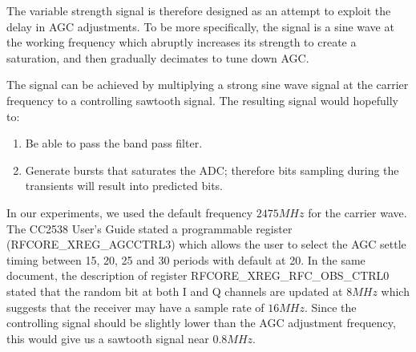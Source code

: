 The variable strength signal is therefore designed as an attempt to exploit the delay in AGC adjustments. To be more specifically, the signal is a sine wave at the working frequency which abruptly increases its strength to create a saturation, and then gradually decimates to tune down AGC. 
 
The signal can be achieved by multiplying a strong sine wave signal at the carrier frequency to a controlling sawtooth signal. The resulting signal would hopefully to:
\begin{enumerate}
	\item Be able to pass the band pass filter.
	\item Generate bursts that saturates the ADC; therefore bits sampling during the transients will result into predicted bits.
\end{enumerate}

In our experiments, we used the default frequency $2475MHz$ for the carrier wave. The CC2538 User's Guide\cite{CC2538Manual} stated a programmable register (RFCORE\_XREG\_AGCCTRL3) which allows the user to select the AGC settle timing between 15, 20, 25 and 30 periods with default at 20. In the same document, the description of register RFCORE\_XREG\_RFC\_OBS\_CTRL0 stated that the random bit at both I and Q channels are updated at $8MHz$ which suggests that the receiver may have a sample rate of $16MHz$. Since the controlling signal should be slightly lower than the AGC adjustment frequency, this would give us a sawtooth signal near $0.8MHz$.
 
%
%
%

